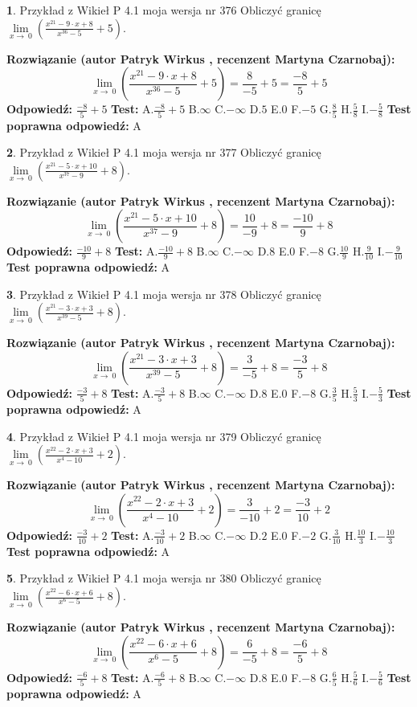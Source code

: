 \documentclass[12pt, a4paper]{article}
\theoremstyle{definition} %
\newtheorem{zad}{}
\newcommand{\zadStart}[1]{\begin{zad}#1\newline}
\newcommand{\zadStop}{\end{zad}}
\newcommand{\rozwStart}[2]{\noindent \textbf{Rozwiązanie (autor #1 , recenzent #2): }\newline}
\newcommand{\rozwStop}{\newline}
\newcommand{\odpStart}{\noindent \textbf{Odpowiedź:}\newline}
\newcommand{\odpStop}{\newline}
\newcommand{\testStart}{\noindent \textbf{Test:}\newline}
\newcommand{\testStop}{\newline}
\newcommand{\kluczStart}{\noindent \textbf{Test poprawna odpowiedź:}\newline}
\newcommand{\kluczStop}{\newline}
\begin{document}
\zadStart{Przykład z Wikieł P 4.1 moja wersja nr 376}
Obliczyć granicę $\lim\limits_{x\to\ 0}(\frac{x^{21}-9 \cdot x +8}{x^{36}-5}+5)$.
\zadStop
\rozwStart{Patryk Wirkus}{Martyna Czarnobaj}
$$\lim\limits_{x\to\ 0}(\frac{x^{21}-9 \cdot x +8}{x^{36}-5}+5)=\frac{8}{-5}+5=\frac{-8}{5}+5$$
\rozwStop
\odpStart
$\frac{-8}{5}+5$
\odpStop
\testStart
A.$\frac{-8}{5}+5$
B.$\infty$
C.$-\infty$
D.$5$
E.$0$
F.$-5$
G.$\frac{8}{5}$
H.$\frac{5}{8}$
I.$-\frac{5}{8}$
\testStop
\kluczStart
A
\kluczStop



\zadStart{Przykład z Wikieł P 4.1 moja wersja nr 377}
Obliczyć granicę $\lim\limits_{x\to\ 0}(\frac{x^{21}-5 \cdot x +10}{x^{37}-9}+8)$.
\zadStop
\rozwStart{Patryk Wirkus}{Martyna Czarnobaj}
$$\lim\limits_{x\to\ 0}(\frac{x^{21}-5 \cdot x +10}{x^{37}-9}+8)=\frac{10}{-9}+8=\frac{-10}{9}+8$$
\rozwStop
\odpStart
$\frac{-10}{9}+8$
\odpStop
\testStart
A.$\frac{-10}{9}+8$
B.$\infty$
C.$-\infty$
D.$8$
E.$0$
F.$-8$
G.$\frac{10}{9}$
H.$\frac{9}{10}$
I.$-\frac{9}{10}$
\testStop
\kluczStart
A
\kluczStop



\zadStart{Przykład z Wikieł P 4.1 moja wersja nr 378}
Obliczyć granicę $\lim\limits_{x\to\ 0}(\frac{x^{21}-3 \cdot x +3}{x^{39}-5}+8)$.
\zadStop
\rozwStart{Patryk Wirkus}{Martyna Czarnobaj}
$$\lim\limits_{x\to\ 0}(\frac{x^{21}-3 \cdot x +3}{x^{39}-5}+8)=\frac{3}{-5}+8=\frac{-3}{5}+8$$
\rozwStop
\odpStart
$\frac{-3}{5}+8$
\odpStop
\testStart
A.$\frac{-3}{5}+8$
B.$\infty$
C.$-\infty$
D.$8$
E.$0$
F.$-8$
G.$\frac{3}{5}$
H.$\frac{5}{3}$
I.$-\frac{5}{3}$
\testStop
\kluczStart
A
\kluczStop



\zadStart{Przykład z Wikieł P 4.1 moja wersja nr 379}
Obliczyć granicę $\lim\limits_{x\to\ 0}(\frac{x^{22}-2 \cdot x +3}{x^{4}-10}+2)$.
\zadStop
\rozwStart{Patryk Wirkus}{Martyna Czarnobaj}
$$\lim\limits_{x\to\ 0}(\frac{x^{22}-2 \cdot x +3}{x^{4}-10}+2)=\frac{3}{-10}+2=\frac{-3}{10}+2$$
\rozwStop
\odpStart
$\frac{-3}{10}+2$
\odpStop
\testStart
A.$\frac{-3}{10}+2$
B.$\infty$
C.$-\infty$
D.$2$
E.$0$
F.$-2$
G.$\frac{3}{10}$
H.$\frac{10}{3}$
I.$-\frac{10}{3}$
\testStop
\kluczStart
A
\kluczStop



\zadStart{Przykład z Wikieł P 4.1 moja wersja nr 380}
Obliczyć granicę $\lim\limits_{x\to\ 0}(\frac{x^{22}-6 \cdot x +6}{x^{6}-5}+8)$.
\zadStop
\rozwStart{Patryk Wirkus}{Martyna Czarnobaj}
$$\lim\limits_{x\to\ 0}(\frac{x^{22}-6 \cdot x +6}{x^{6}-5}+8)=\frac{6}{-5}+8=\frac{-6}{5}+8$$
\rozwStop
\odpStart
$\frac{-6}{5}+8$
\odpStop
\testStart
A.$\frac{-6}{5}+8$
B.$\infty$
C.$-\infty$
D.$8$
E.$0$
F.$-8$
G.$\frac{6}{5}$
H.$\frac{5}{6}$
I.$-\frac{5}{6}$
\testStop
\kluczStart
A
\kluczStop
\end{document}
